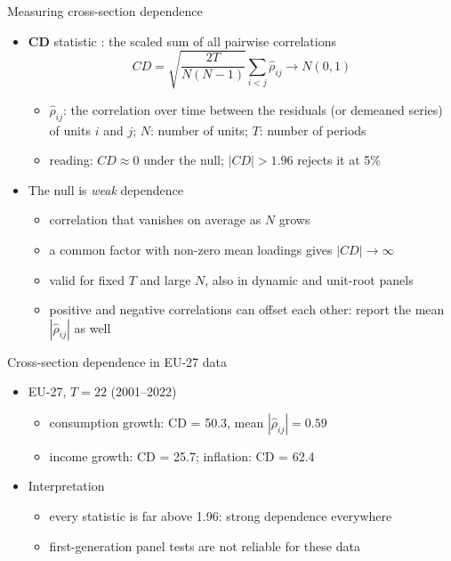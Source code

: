 \begin{frame}{Measuring cross-section dependence}
\itemsize{\small}
\begin{itemize}
    \item \textbf{CD} statistic : the scaled sum of all pairwise correlations \[ CD = \sqrt{\dfrac{2T}{N(N - 1)}}\sum_{i<j}\hat\rho_{ij} \to N(0, 1) \]
    \begin{itemize}
        \item $\hat\rho_{ij}$: the correlation over time between the residuals (or demeaned series) of units $i$ and $j$; $N$: number of units; $T$: number of periods
        \item reading: $CD \approx 0$ under the null; $|CD| > 1.96$ rejects it at 5\%
    \end{itemize}
    \item The null is \emph{weak} dependence 
    \begin{itemize}
        \item correlation that vanishes on average as $N$ grows
        \item a common factor with non-zero mean loadings gives $|CD| \to \infty$
        \item valid for fixed $T$ and large $N$, also in dynamic and unit-root panels
        \item positive and negative correlations can offset each other: report the mean $|\hat\rho_{ij}|$ as well
    \end{itemize}
\end{itemize}
\end{frame}

\begin{frame}{Cross-section dependence in EU-27 data}
\itemsize{\small}
\begin{itemize}
    \item EU-27, $T = 22$ (2001--2022)
    \begin{itemize}
        \item consumption growth: CD = 50.3, mean $|\hat\rho_{ij}| = 0.59$
        \item income growth: CD = 25.7; inflation: CD = 62.4
    \end{itemize}
    \item Interpretation
    \begin{itemize}
        \item every statistic is far above 1.96: strong dependence everywhere
        \item first-generation panel tests are not reliable for these data
    \end{itemize}
\end{itemize}
\end{frame}

